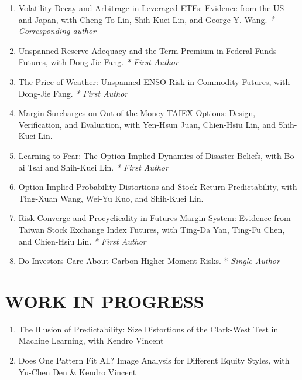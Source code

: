 \documentclass[12pt, letterpaper]{article}
\begin{document}
\begin{enumerate}
        \item Volatility Decay and Arbitrage in Leveraged ETFs: Evidence from the US and Japan, with Cheng-To Lin, Shih-Kuei Lin, and George Y. Wang. \textit{* Corresponding author}

        \item Unspanned Reserve Adequacy and the Term Premium in Federal Funds Futures, with Dong-Jie Fang. \textit{* First Author}

        \item The Price of Weather: Unspanned ENSO Risk in Commodity Futures, with Dong-Jie Fang. \textit{* First Author}

        \item Margin Surcharges on Out-of-the-Money TAIEX Options: Design, Verification, and Evaluation, with Yen-Hsun Juan, Chien-Hsiu Lin, and Shih-Kuei Lin.
        
        \item Learning to Fear: The Option-Implied Dynamics of Disaster Beliefs, with Bo-ai Tsai and Shih-Kuei Lin. \textit{* First Author}

        \item Option-Implied Probability Distortions and Stock Return Predictability, with Ting-Xuan Wang, Wei-Yu Kuo, and Shih-Kuei Lin.
        
        \item Risk Converge and Procyclicality in Futures Margin System: Evidence from Taiwan Stock Exchange Index Futures, with Ting-Da Yan, Ting-Fu Chen, and Chien-Hsiu Lin. \textit{* First Author}
        
        \item Do Investors Care About Carbon Higher Moment Risks. * \textit{Single Author}
        
        
    \end{enumerate}
    \section{WORK IN PROGRESS}
    \begin{enumerate}
        \item The Illusion of Predictability: Size Distortions of the Clark-West Test in Machine Learning, with Kendro Vincent
        \item Does One Pattern Fit All? Image Analysis for Different Equity Styles, with Yu-Chen Den \& Kendro Vincent
    \end{enumerate}
\end{document}
